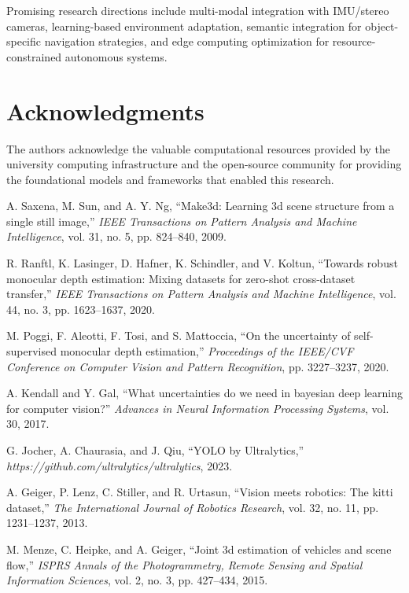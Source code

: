 \documentclass[10pt]{article}
\begin{document}
Promising research directions include multi-modal integration with IMU/stereo cameras, learning-based environment adaptation, semantic integration for object-specific navigation strategies, and edge computing optimization for resource-constrained autonomous systems.

\section*{Acknowledgments}

The authors acknowledge the valuable computational resources provided by the university computing infrastructure and the open-source community for providing the foundational models and frameworks that enabled this research.

\begin{thebibliography}{99}

A. Saxena, M. Sun, and A. Y. Ng,
``Make3d: Learning 3d scene structure from a single still image,''
\emph{IEEE Transactions on Pattern Analysis and Machine Intelligence}, vol. 31, no. 5, pp. 824--840, 2009.

R. Ranftl, K. Lasinger, D. Hafner, K. Schindler, and V. Koltun,
``Towards robust monocular depth estimation: Mixing datasets for zero-shot cross-dataset transfer,''
\emph{IEEE Transactions on Pattern Analysis and Machine Intelligence}, vol. 44, no. 3, pp. 1623--1637, 2020.

M. Poggi, F. Aleotti, F. Tosi, and S. Mattoccia,
``On the uncertainty of self-supervised monocular depth estimation,''
\emph{Proceedings of the IEEE/CVF Conference on Computer Vision and Pattern Recognition}, pp. 3227--3237, 2020.

A. Kendall and Y. Gal,
``What uncertainties do we need in bayesian deep learning for computer vision?''
\emph{Advances in Neural Information Processing Systems}, vol. 30, 2017.

G. Jocher, A. Chaurasia, and J. Qiu,
``YOLO by Ultralytics,''
\emph{https://github.com/ultralytics/ultralytics}, 2023.

A. Geiger, P. Lenz, C. Stiller, and R. Urtasun,
``Vision meets robotics: The kitti dataset,''
\emph{The International Journal of Robotics Research}, vol. 32, no. 11, pp. 1231--1237, 2013.

M. Menze, C. Heipke, and A. Geiger,
``Joint 3d estimation of vehicles and scene flow,''
\emph{ISPRS Annals of the Photogrammetry, Remote Sensing and Spatial Information Sciences}, vol. 2, no. 3, pp. 427--434, 2015.


\end{thebibliography}
\end{document}
